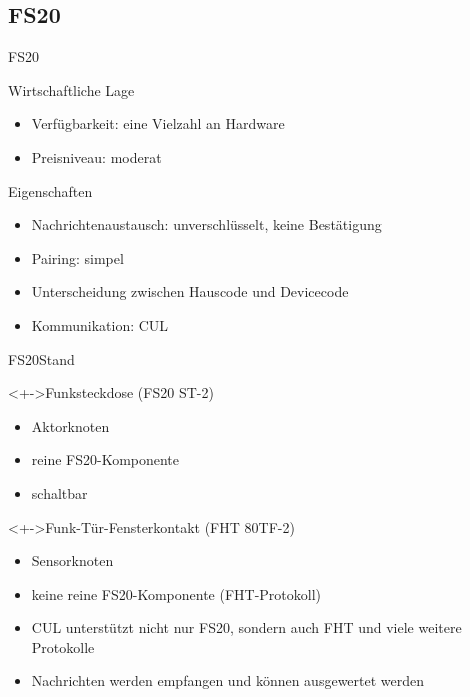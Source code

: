 \subsection{FS20}

\begin{frame}{FS20}

\begin{block}{Wirtschaftliche Lage}
\begin{itemize}
\item 	Verfügbarkeit: eine Vielzahl an Hardware
\item 	Preisniveau: moderat
\end{itemize}
\end{block}

\begin{block}{Eigenschaften}
\begin{itemize}
\item 	Nachrichtenaustausch: unverschlüsselt, keine Bestätigung
\item 	Pairing: simpel 
\item 	Unterscheidung zwischen Hauscode und Devicecode
\item 	Kommunikation: CUL 
\end{itemize}
\end{block}
\end{frame}

\begin{frame}{FS20}{Stand}

\begin{block}<+->{Funksteckdose (FS20 ST-2)}
\begin{itemize}
\item 	Aktorknoten
\item 	reine FS20-Komponente
\item 	schaltbar 
\end{itemize}
\end{block}

\begin{block}<+->{Funk-Tür-Fensterkontakt (FHT 80TF-2)}
\begin{itemize}
\item 	Sensorknoten
\item 	keine reine FS20-Komponente (FHT-Protokoll)
\item 	CUL unterstützt nicht nur FS20,
		sondern auch FHT und viele weitere Protokolle
\item 	Nachrichten werden empfangen und können ausgewertet werden
\end{itemize}
\end{block}
\end{frame}

